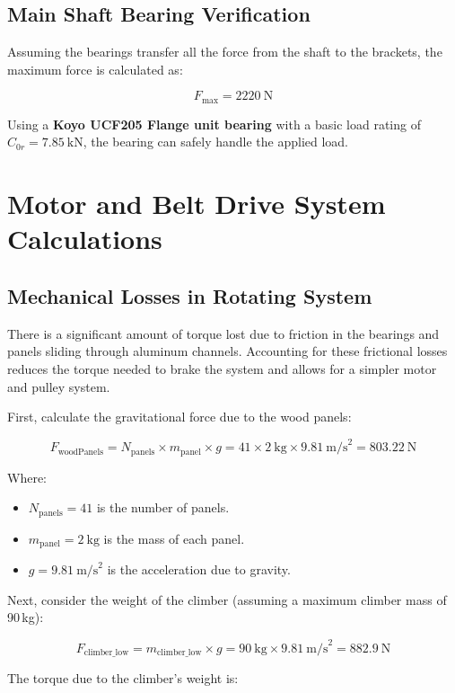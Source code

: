 \subsection*{Main Shaft Bearing Verification}

Assuming the bearings transfer all the force from the shaft to the brackets, the maximum force is calculated as:

\[
F_{\text{max}} = 2220\ \text{N}
\]

Using a \textbf{Koyo UCF205 Flange unit bearing} with a basic load rating of \( C_{0r} = 7.85\ \text{kN} \), the bearing can safely handle the applied load.

\section{Motor and Belt Drive System Calculations}
\label{calcs:motor_belt}

\subsection*{Mechanical Losses in Rotating System}

There is a significant amount of torque lost due to friction in the bearings and panels sliding through aluminum channels. Accounting for these frictional losses reduces the torque needed to brake the system and allows for a simpler motor and pulley system.

First, calculate the gravitational force due to the wood panels:

\[
F_{\text{woodPanels}} = N_{\text{panels}} \times m_{\text{panel}} \times g = 41 \times 2\ \text{kg} \times 9.81\ \text{m/s}^2 = 803.22\ \text{N}
\]

Where:
\begin{itemize}
    \item \( N_{\text{panels}} = 41 \) is the number of panels.
    \item \( m_{\text{panel}} = 2\ \text{kg} \) is the mass of each panel.
    \item \( g = 9.81\ \text{m/s}^2 \) is the acceleration due to gravity.
\end{itemize}

Next, consider the weight of the climber (assuming a maximum climber mass of 90\,kg):

\[
F_{\text{climber\_low}} = m_{\text{climber\_low}} \times g = 90\ \text{kg} \times 9.81\ \text{m/s}^2 = 882.9\ \text{N}
\]

The torque due to the climber's weight is:

